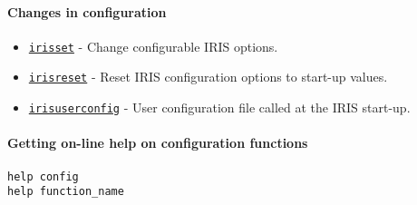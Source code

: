 \paragraph{Changes in configuration}

\begin{itemize}
\itemsep1pt\parskip0pt
\item
  \href{config/irisset}{\texttt{irisset}} - Change configurable IRIS
  options.
\item
  \href{config/irisreset}{\texttt{irisreset}} - Reset IRIS configuration
  options to start-up values.
\item
  \href{config/irisuserconfighelp}{\texttt{irisuserconfig}} - User
  configuration file called at the IRIS start-up.
\end{itemize}

\paragraph{Getting on-line help on configuration
functions}

\begin{verbatim}
help config
help function_name
\end{verbatim}



